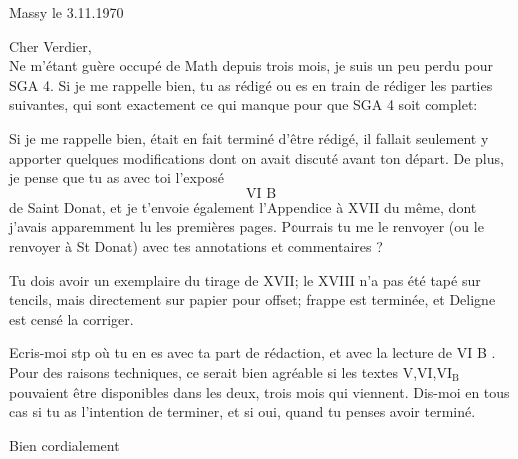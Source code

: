 \begin{flushright}
Massy le 3.11.1970\\
\end{flushright}
Cher Verdier,\\

Ne m'étant guère occupé de Math depuis trois mois, je suis un peu perdu pour SGA 4. Si je me rappelle bien, tu as rédigé ou es en train de rédiger les parties suivantes, qui sont exactement ce qui manque pour que SGA 4 soit complet:

Si je me rappelle bien,  était en fait terminé d'être rédigé, il fallait seulement y apporter quelques modifications dont on avait discuté avant ton départ. De plus, je pense que tu as avec toi l'exposé
\[
\text{VI B}
\]
de Saint Donat, et je t'envoie également l'Appendice à XVII du même, dont j'avais apparemment lu les premières pages. P\(\mathbb{o}\)urrais tu me le renvoyer (ou le renvoyer à St Donat) avec tes annotations et commentaires ?

Tu dois avoir un exemplaire du tirage de XVII; le XVIII n'a pas été tapé sur tencils, mais directement sur papier pour offset;  frappe est terminée, et Deligne est censé la corriger.

Ecris-moi stp où tu en es avec ta part de rédaction, et avec la lecture de VI B .  Pour des raisons techniques, ce serait bien agréable si les textes V,VI,\(\mathrm{VI}_{\mathrm{B}}\) pouvaient être disponibles dans les deux, trois mois qui viennent. Dis-moi en tous cas si tu as l'intention de terminer, et si oui, quand tu penses avoir terminé.

Bien cordialement\\
